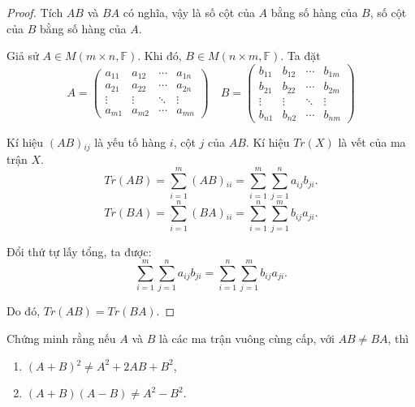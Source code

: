 \documentclass[class=linearalgebra,crop=false]{standalone}
\begin{document}
\begin{proof}
    Tích $AB$ và $BA$ có nghĩa, vậy là số cột của $A$ bằng số hàng của $B$, số cột của $B$ bằng số hàng của $A$.
    \par Giả sử $A\in M(m\times n, \mathbb{F})$. Khi đó, $B\in M(n\times m, \mathbb{F})$. Ta đặt
    \[
        A =
        \begin{pmatrix}
            a_{11} & a_{12} & \cdots & a_{1n} \\
            a_{21} & a_{22} & \cdots & a_{2n} \\
            \vdots & \vdots & \ddots & \vdots \\
            a_{m1} & a_{m2} & \cdots & a_{mn}
        \end{pmatrix}
        \quad
        B =
        \begin{pmatrix}
            b_{11} & b_{12} & \cdots & b_{1m} \\
            b_{21} & b_{22} & \cdots & b_{2m} \\
            \vdots & \vdots & \ddots & \vdots \\
            b_{n1} & b_{n2} & \cdots & b_{nm}
        \end{pmatrix}
    \]
    \par Kí hiệu $(AB){}_{ij}$ là yếu tố hàng $i$, cột $j$ của $AB$. Kí hiệu $Tr(X)$ là vết của ma trận $X$.
    \[
        Tr(AB) = \sum^{m}_{i=1}(AB){}_{ii} = \sum^{m}_{i=1}\sum^{n}_{j=1}a_{ij}b_{ji}.
    \]
    \[
        Tr(BA) = \sum^{n}_{i=1}(BA){}_{ii} = \sum^{n}_{i=1}\sum^{m}_{j=1}b_{ij}a_{ji}.
    \]
    \par Đổi thứ tự lấy tổng, ta được:
    \[
        \sum^{m}_{i=1}\sum^{n}_{j=1}a_{ij}b_{ji} = \sum^{n}_{i=1}\sum^{m}_{j=1}b_{ij}a_{ji}.
    \]
    \par Do đó, $Tr(AB) = Tr(BA)$.
\end{proof}

\begin{exercise}
    Chứng minh rằng nếu $A$ và $B$ là các ma trận vuông cùng cấp, với $AB\ne BA$, thì
    \begin{enumerate}[label = (\alph*)]
        \item $(A+B){}^{2}\ne A^{2} + 2AB + B^{2}$,
        \item $(A+B)(A-B)\ne A^{2} - B^{2}$.
    \end{enumerate}
\end{exercise}
\end{document}
